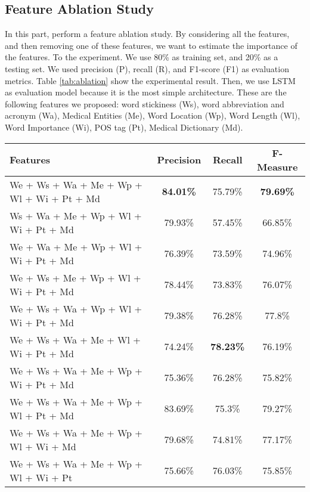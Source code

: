\subsection{Feature Ablation Study}
In this part, perform a feature ablation study. By considering all the features, and then removing one of these features, we want to estimate the importance of the features. To the experiment. We use 80\% as training set, and 20\% as a testing set. We used precision (P), recall (R), and F1-score (F1) as evaluation metrics. Table \ref{tab:ablation} show the experimental result. Then, we use LSTM as evaluation model because it is the most simple architecture. These are the following features we proposed: word stickiness (Ws), word abbreviation and acronym (Wa), Medical Entities (Me), Word Location (Wp), Word Length (Wl), Word Importance (Wi), POS tag (Pt), Medical Dictionary (Md).

\begin{table*}
	\caption{Feature Ablation Study Result}
	\label{tab:ablation}
	\begin{tabular}{lccc}
		\toprule
		Features&Precision&Recall&F-Measure\\
		\midrule
		We + Ws + Wa + Me + Wp + Wl + Wi + Pt + Md & \textbf{84.01\%} & 75.79\% & \textbf{79.69\%} \\
		
		Ws + Wa + Me + Wp + Wl + Wi + Pt + Md & 79.93\% & 57.45\% & 66.85\% \\
		
		We + Wa + Me + Wp + Wl + Wi + Pt + Md & 76.39\% & 73.59\% & 74.96\% \\
		
		We + Ws + Me + Wp + Wl + Wi + Pt + Md & 78.44\% & 73.83\% & 76.07\% \\
		
		We + Ws + Wa + Wp + Wl + Wi + Pt + Md & 79.38\% & 76.28\% & 77.8\% \\
		
		We + Ws + Wa + Me + Wl + Wi + Pt + Md & 74.24\% & \textbf{78.23\%} & 76.19\% \\
		
		We + Ws + Wa + Me + Wp + Wi + Pt + Md & 75.36\% & 76.28\% & 75.82\% \\
		
		We + Ws + Wa + Me + Wp + Wl + Pt + Md & 83.69\% & 75.3\% & 79.27\% \\
		
		We + Ws + Wa + Me + Wp + Wl + Wi + Md & 79.68\% & 74.81\% & 77.17\% \\
		
		We + Ws + Wa + Me + Wp + Wl + Wi + Pt & 75.66\% & 76.03\% & 75.85\% \\
		\bottomrule
	\end{tabular}
\end{table*}


